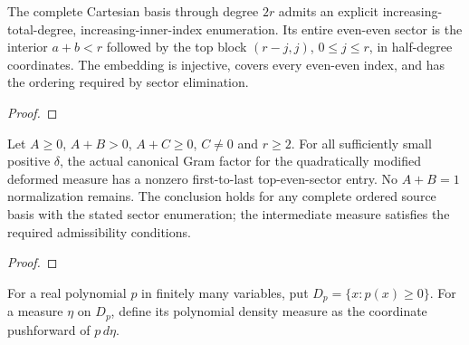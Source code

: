\begin{supporting}
\begin{theorem}
\label{thm:ordered-cartesian-even-sector}
\leanok
The complete Cartesian basis through degree $2r$ admits an explicit increasing-total-degree, increasing-inner-index enumeration. Its entire even-even sector is the interior $a+b<r$ followed by the top block $(r-j,j)$, $0\le j\le r$, in half-degree coordinates. The embedding is injective, covers every even-even index, and has the ordering required by sector elimination.
\end{theorem}
\begin{proof}
\leanok
\end{proof}

\begin{theorem}
\label{thm:canonical-quadratic-distant-entry}
\leanok
Let $A\ge0$, $A+B>0$, $A+C\ge0$, $C\ne0$ and $r\ge2$. For all sufficiently small positive $\delta$, the actual canonical Gram factor for the quadratically modified deformed measure has a nonzero first-to-last top-even-sector entry.  No $A+B=1$ normalization remains.
The conclusion holds for any complete ordered source basis with the stated sector enumeration; the intermediate measure satisfies the required admissibility conditions.
\end{theorem}
\begin{proof}
\leanok
\end{proof}

\begin{definition}
\label{def:multivariate-polynomial-density-measure}
\leanok
For a real polynomial $p$ in finitely many variables, put
$D_p=\{x:p(x)\ge0\}$. For a measure $\eta$ on $D_p$, define its polynomial
density measure as the coordinate pushforward of $p\,d\eta$.
\end{definition}


\end{supporting}
